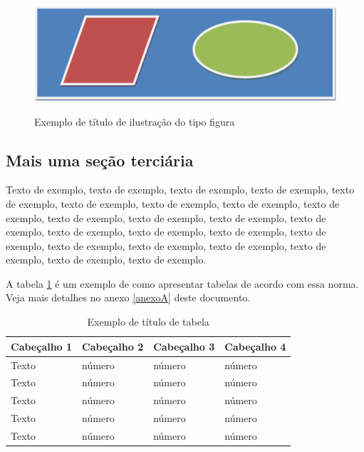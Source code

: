 \documentclass[
	12pt,				%
	oneside,			%
	a4paper,			%
	english,			%
	brazil				%
	]{abntex2ppgsi}
\begin{document}
\begin{figure}[htbp]
	\centering
	\caption{Exemplo de título de ilustração do tipo figura}
		\includegraphics{figuras/figura-exemplo.png}
	\label{fig:figura-exemplo3}
\end{figure}

\subsection{Mais uma seção terciária}

Texto de exemplo, texto de exemplo, texto de exemplo, texto de exemplo, texto de exemplo, texto de exemplo, texto de exemplo, texto de exemplo, texto de exemplo, texto de exemplo, texto de exemplo, texto de exemplo, texto de exemplo, texto de exemplo, texto de exemplo, texto de exemplo, texto de exemplo, texto de exemplo, texto de exemplo, texto de exemplo, texto de exemplo, texto de exemplo, texto de exemplo.

A tabela \ref{tab:ExemploDeTabela3} é um exemplo de como apresentar tabelas de acordo com essa norma. Veja mais detalhes no anexo \ref{anexoA} deste documento.

\begin{table}[htbp]
	\centering
	\caption{Exemplo de título de tabela}
		\begin{tabular}{p{0.85in} p{0.85in} p{0.85in} p{0.85in} } \hline
		
		Cabeçalho 1	& Cabeçalho 2	& Cabeçalho 3	& Cabeçalho 4 \\ \hline
		Texto	& número & número	& número \\ 
		Texto	& número & número	& número \\ 
		Texto	& número & número	& número \\ 
		Texto	& número & número	& número \\ 
		Texto	& número & número	& número \\ \hline
			
		\end{tabular}
	\label{tab:ExemploDeTabela3}
\end{table}
\end{document}
